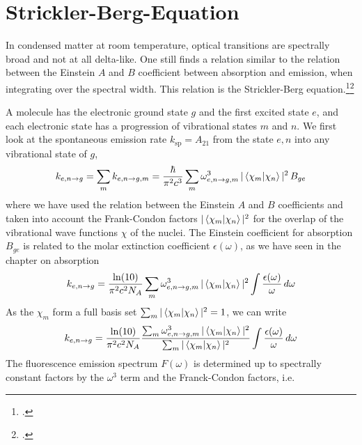 \section{Strickler-Berg-Equation} 


In condensed matter at room temperature, optical transitions are spectrally broad and not at all delta-like. One still finds a relation similar to the relation between the Einstein $A$ and $B$ coefficient between absorption and emission, when integrating over the spectral width. This relation is the  Strickler-Berg equation.\footcite[chapter 5.3][]{Strickler_Berg, Parson}\footcite[chapter 
1.4.3.2]{KoehlerBaessler2015}


A molecule has the electronic ground state $g$ and the first excited state $e$, and each electronic state has a progression of vibrational states $m$ and $n$. We first look at the spontaneous emission rate  $k_{\text{sp}} =  A_{21}$
from the state $e,n$ into any vibrational state of $g$, 
%
\begin{equation}
k_{e,n \rightarrow g}  = \sum_m  k_{e,n \rightarrow g,m}  = \frac{\hbar}{\pi^2 c^3} \sum_m  \omega_{e,n \rightarrow g,m}^3 \,  | \braket{\chi_m |  \chi_n} |^2 \, B_{ge} 
\end{equation}
where we have used the relation between the Einstein $A$ and $B$ coefficients and taken into account the Frank-Condon factors $ | \braket {\chi_m | \chi_n} |^2 $ for the overlap of the vibrational wave functions $\chi$ of the nuclei.
%
The Einstein coefficient for absorption $B_{ge} $ is related to the molar extinction coefficient $\epsilon(\omega)$, as we have seen in the chapter on absorption
\begin{equation}
 k_{e,n \rightarrow g}  = \frac{\ln(10)}{\pi^2 c^2 N_A} \sum_m  \omega_{e,n \rightarrow g,m}^3 \,  | \braket{\chi_m |  \chi_n} |^2
 \int \frac{\epsilon(\omega)}{\omega} \, d \omega
\end{equation}
%
As the  $\chi_m$ form a full basis set $\sum_m  | \braket {\chi_m | \chi_n} |^2 = 1$,  we can write
\begin{equation}
 k_{e,n \rightarrow g}  = \frac{\ln(10)}{\pi^2 c^2 N_A} 
%
\frac{ 
 \sum_m  \omega_{e,n \rightarrow g,m}^3 \,  | \braket{\chi_m |  \chi_n} |^2 }
 { \sum_m  | \braket {\chi_m | \chi_n} |^2 }
 \int \frac{\epsilon(\omega)}{\omega} \, d \omega
\end{equation}
The fluorescence emission spectrum $F(\omega)$ is determined up to spectrally constant factors by the $\omega^3$ term and the Franck-Condon factors, i.e.
